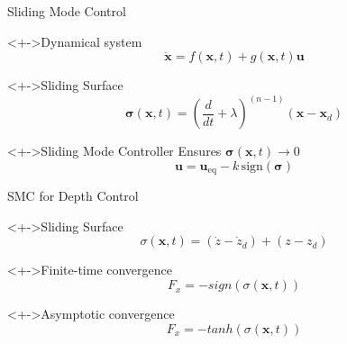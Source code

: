 \documentclass[9pt, xcolor={usenames, dvipsnames}]{beamer}
\begin{document}
        \begin{frame}{Sliding Mode Control}
            \begin{block}<+->{Dynamical system}
                \begin{equation}
                    \dot{\mathbf{x}} = f(\mathbf{x},t) + g(\mathbf{x},t)\mathbf{u}
                \end{equation}
            \end{block}
            \begin{block}<+->{Sliding Surface}
                \begin{equation}
                    \boldsymbol{\sigma}(\mathbf{x},t) = \left(\frac{d}{dt} + \lambda\right)^{(n-1)} (\mathbf{x} - \mathbf{x}_d)
                \end{equation}
            \end{block}
            \begin{block}<+->{Sliding Mode Controller}
                Ensures $\boldsymbol{\sigma}(\mathbf{x},t)\to 0$
                \begin{equation}
                    \mathbf{u} = \mathbf{u}_{\text{eq}} - k \,\mathrm{sign}(\boldsymbol{\sigma})
                \end{equation}
            \end{block}
        \end{frame}

        \begin{frame}{SMC for Depth Control}
            \begin{block}<+->{Sliding Surface}
                \begin{equation}
                    \sigma(\mathbf{x}, t) = (\dot z - \dot z_d) + (z - z_d)
                \end{equation}
            \end{block}
            \begin{block}<+->{Finite-time convergence}
                \begin{equation}
                    F_x = - sign(\sigma(\mathbf{x}, t))
                \end{equation}
            \end{block}
            \begin{block}<+->{Asymptotic convergence}
                \begin{equation}
                    F_x = - tanh(\sigma(\mathbf{x}, t))
                \end{equation}
            \end{block}
        \end{frame}
\end{document}
